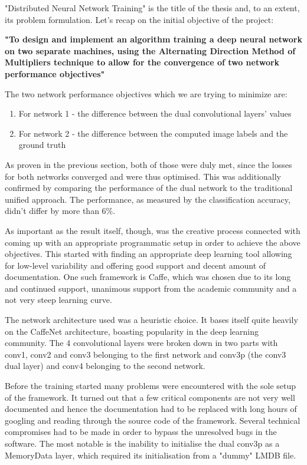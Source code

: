 \documentclass[a4paper, 12pt]{article}
\numberwithin{equation}{section}
\begin{document}
	"Distributed Neural Network Training" is the title of the thesis and, to an extent, its problem formulation. Let's recap on the initial objective of the project:
	
	\textbf{"To design and implement an algorithm training a deep neural network on two separate machines, using the Alternating Direction Method of Multipliers technique to allow for the convergence of two network performance objectives"}
	
	The two network performance objectives which we are trying to minimize are:
	\begin{enumerate}
		\item For network 1 - the difference between the dual convolutional layers' values
		\item For network 2 - the difference between the computed image labels and the ground truth
	\end{enumerate}
	
	As proven in the previous section, both of those were duly met, since the losses for both networks converged and were thus optimised. This was additionally confirmed by comparing the performance of the dual network to the traditional unified approach. The performance, as measured by the classification accuracy, didn't differ by more than 6\%.
	
	As important as the result itself, though, was the creative process connected with coming up with an appropriate programmatic setup in order to achieve the above objectives. This started with finding an appropriate deep learning tool allowing for low-level variability and offering good support and decent amount of documentation. One such framework is Caffe, which was chosen due to its long and continued support, unanimous support from the academic community and a not very steep learning curve.
	
	The network architecture used was a heuristic choice. It bases itself quite heavily on the CaffeNet architecture, boasting popularity in the deep learning community. The 4 convolutional layers were broken down in two parts with conv1, conv2 and conv3 belonging to the first network and conv3p (the conv3 dual layer) and conv4 belonging to the second network.
	
	Before the training started many problems were encountered with the sole setup of the framework. It turned out that a few critical components are not very well documented and hence the documentation had to be replaced with long hours of googling and reading through the source code of the framework. Several technical compromises had to be made in order to bypass the unresolved bugs in the software. The most notable is the inability to initialise the dual conv3p as a MemoryData layer, which required its initialisation from a "dummy" LMDB file.
	
\end{document}
